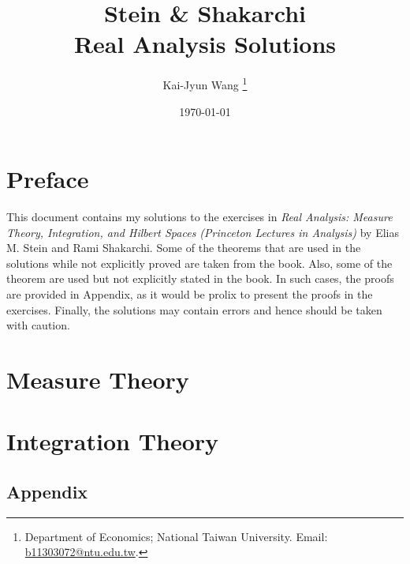 \documentclass[12pt]{article}
\title{
    Stein \& Shakarchi \\
    Real Analysis Solutions
    }
\author{%
   Kai-Jyun Wang
   \thanks{Department of Economics; National Taiwan University. 
   Email: \url{b11303072@ntu.edu.tw}.}
}
\date{\today}
\begin{document}

\maketitle

\section*{Preface}
This document contains my solutions to the exercises in 
\textit{Real Analysis: Measure Theory, Integration, and 
Hilbert Spaces (Princeton Lectures in Analysis)} by 
Elias M. Stein and Rami Shakarchi. Some of the theorems
that are used in the solutions while not explicitly proved 
are taken from the book. Also, some of the theorem are used 
but not explicitly stated in the book. In such cases, the 
proofs are provided in Appendix, as it would be prolix to 
present the proofs in the exercises. Finally, the solutions 
may contain errors and hence should be taken with caution.

\newpage
\textbf{\tableofcontents}
\newpage

\section{Measure Theory}







\newpage
\section{Integration Theory}




\newpage
\begin{appendices}
    \section{Appendix}
    
\end{appendices}
\end{document}
